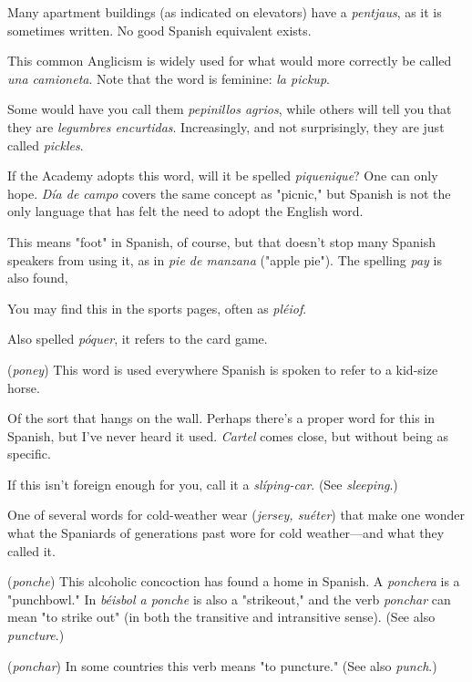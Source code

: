  Many apartment buildings (as indicated on elevators) have a \emph{pentjaus}, as it is sometimes written. No good Spanish
equivalent exists.

 This common Anglicism is widely used for what
would more correctly be called \emph{una camioneta}. Note that the word is
feminine: \emph{la pickup}.

 Some would have you call them \emph{pepinillos agrios},
while others will tell you that they are \emph{legumbres encurtidas}. Increasingly, and not surprisingly, they are just called \emph{pickles}.

 If the Academy adopts this word, will it be spelled \emph{piquenique}? One can only hope. \emph{Día de campo} covers the same concept
as "picnic," but Spanish is not the only language that has felt the need
to adopt the English word.

 This means "foot" in Spanish, of course, but that doesn't
stop many Spanish speakers from using it, as in \emph{pie de manzana}
("apple pie"). The spelling \emph{pay} is also found,

 You may find this in the sports pages, often as
\emph{pléiof}.

 Also spelled \emph{póquer}, it refers to the card game.

 (\emph{poney}) This word is used everywhere Spanish is spoken to refer to a kid-size horse.

 Of the sort that hangs on the wall. Perhaps there's a
proper word for this in Spanish, but I've never heard it used. \emph{Cartel}
comes close, but without being as specific.

 If this isn't foreign enough for you, call it a \emph{slíping-car}. (See \emph{sleeping}.)

 One of several words for cold-weather wear (\emph{jersey, suéter}) that make one wonder what the Spaniards of generations
past wore for cold weather---and what they called it.

 (\emph{ponche}) This alcoholic concoction has found a home
in Spanish. A \emph{ponchera} is a "punchbowl." In \emph{béisbol a ponche} is also
a "strikeout," and the verb \emph{ponchar} can mean "to strike out" (in both
the transitive and intransitive sense). (See also \emph{puncture}.)

 (\emph{ponchar}) In some countries this verb means "to
puncture." (See also \emph{punch}.)

